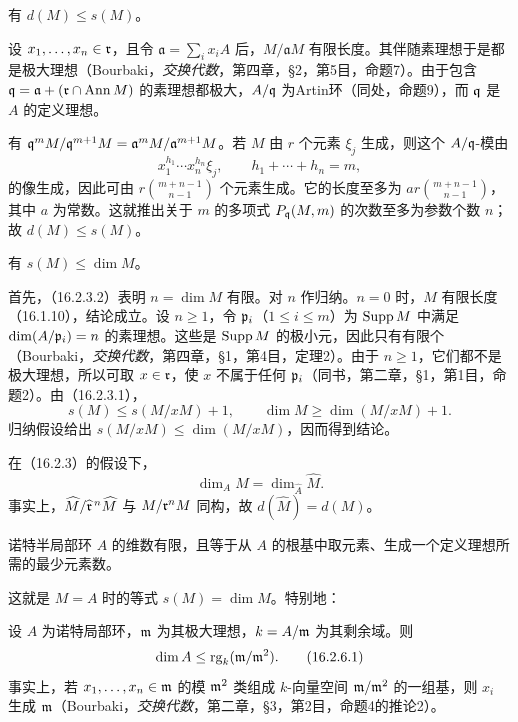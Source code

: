 有 $d(M)\leq s(M)$。

设 $x_1,\ldots,x_n\in\mathfrak r$，且令 $\mathfrak a=\sum_i x_iA$ 后，$M/\mathfrak aM$ 有限长度。其伴随素理想于是都是极大理想（Bourbaki，\textit{交换代数}，第四章，§2，第5目，命题7）。由于包含
$\mathfrak q=\mathfrak a+(\mathfrak r\cap\operatorname{Ann} M)$ 的素理想都极大，$A/\mathfrak q$ 为Artin环（同处，命题9），而 $\mathfrak q$ 是 $A$ 的定义理想。

有 $\mathfrak q^mM/\mathfrak q^{m+1}M=\mathfrak a^mM/\mathfrak a^{m+1}M$。若 $M$ 由 $r$ 个元素 $\xi_j$ 生成，则这个 $A/\mathfrak q$-模由
\[
 x_1^{h_1}\cdots x_n^{h_n}\xi_j,
 \qquad h_1+\cdots+h_n=m,
\]
的像生成，因此可由 $r\binom{m+n-1}{n-1}$ 个元素生成。它的长度至多为
$a r\binom{m+n-1}{n-1}$，其中 $a$ 为常数。这就推出关于 $m$ 的多项式 $P_{\mathfrak q}(M,m)$ 的次数至多为参数个数 $n$；故 $d(M)\leq s(M)$。

有 $s(M)\leq\dim M$。

首先，（16.2.3.2）表明 $n=\dim M$ 有限。对 $n$ 作归纳。$n=0$ 时，$M$ 有限长度（16.1.10），结论成立。设 $n\geq1$，令 $\mathfrak p_i$（$1\leq i\leq m$）为 $\operatorname{Supp} M$ 中满足 $\dim(A/\mathfrak p_i)=n$ 的素理想。这些是 $\operatorname{Supp} M$ 的极小元，因此只有有限个（Bourbaki，\textit{交换代数}，第四章，§1，第4目，定理2）。由于 $n\geq1$，它们都不是极大理想，所以可取 $x\in\mathfrak r$，使 $x$ 不属于任何 $\mathfrak p_i$（同书，第二章，§1，第1目，命题2）。由（16.2.3.1），
\[
 s(M)\leq s(M/xM)+1,\qquad
 \dim M\geq\dim(M/xM)+1.
\]
归纳假设给出 $s(M/xM)\leq\dim(M/xM)$，因而得到结论。

在（16.2.3）的假设下，
\begin{equation}
 \dim_A M=\dim_{\widehat A}\widehat M.
 \tag{16.2.4.1}
\end{equation}
事实上，$\widehat M/\widehat{\mathfrak r}^{\,n}\widehat M$ 与 $M/\mathfrak r^nM$ 同构，故 $d(\widehat M)=d(M)$。

诺特半局部环 $A$ 的维数有限，且等于从 $A$ 的根基中取元素、生成一个定义理想所需的最少元素数。

这就是 $M=A$ 时的等式 $s(M)=\dim M$。特别地：

设 $A$ 为诺特局部环，$\mathfrak m$ 为其极大理想，$k=A/\mathfrak m$ 为其剩余域。则
\begin{equation}
 \dim A\leq\operatorname{rg}_k(\mathfrak m/\mathfrak m^2).
 \tag{16.2.6.1}
\end{equation}
事实上，若 $x_1,\ldots,x_n\in\mathfrak m$ 的模 $\mathfrak m^2$ 类组成 $k$-向量空间 $\mathfrak m/\mathfrak m^2$ 的一组基，则 $x_i$ 生成 $\mathfrak m$（Bourbaki，\textit{交换代数}，第二章，§3，第2目，命题4的推论2）。

